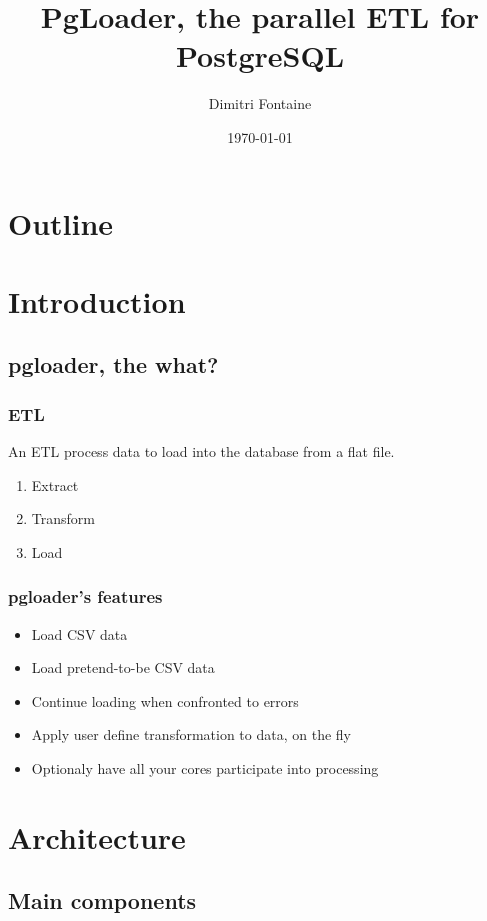 \documentclass{beamer}
\title{PgLoader, the parallel ETL for PostgreSQL}
\author{Dimitri Fontaine}
\date{\today}
\begin{document}
\frame{\titlepage}

\section*{Outline}

\section{Introduction}
\subsection{pgloader, the what?}

\frame
{
  \frametitle{ETL}

  \begin{definition}
    An \alert{ETL} process data to load into the database from a flat
    file.
  \end{definition}

  \begin{enumerate}
   \item Extract
   \item Transform
   \item Load
  \end{enumerate}
}

\frame
{
  \frametitle{pgloader's features}

  \begin{itemize}
   \item<1-> Load CSV data
   \item<2-> Load pretend-to-be CSV data
   \item<3-> Continue loading when confronted to errors
   \item<4-> Apply user define transformation to data, on the fly
   \item<5-> Optionaly have all your cores participate into processing
  \end{itemize}
}

\section{Architecture}
\subsection{Main components}

\end{document}
